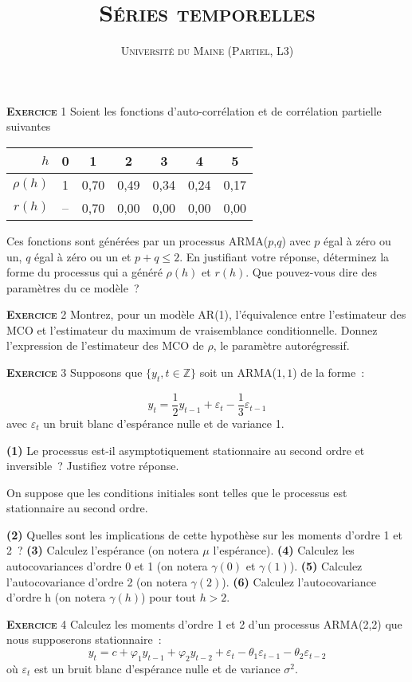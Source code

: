 \documentclass[10pt,a4paper,notitlepage,onecolumn]{article}
\newcommand{\exercice}[1]{\textsc{\textbf{Exercice}} #1}
\newcommand{\question}[1]{\textbf{(#1)}}
\begin{document}
\title{\textsc{Séries temporelles}}
\author{\textsc{Université du Maine (Partiel, L3)}}
\date{}


\maketitle

\exercice{1} Soient les fonctions d'auto-corrélation et de corrélation
partielle suivantes
\begin{table}[H]
  \centering
  \begin{tabular}{r|cccccc}
    \hline\hline
    $h$ & 0 & 1 & 2 & 3 & 4 & 5 \\\hline
    $\rho (h)$ & 1 & 0,70 & 0,49 & 0,34 & 0,24 & 0,17\\
    $r (h)$ & -- & 0,70 & 0,00 & 0,00 & 0,00 & 0,00\\
    \hline\hline
  \end{tabular}
\end{table}
\noindent Ces  fonctions sont générées par  un processus ARMA($p$,$q$)
avec $p$ égal à zéro ou un, $q$ égal  à zéro ou un et $p+q \leq 2$. En
justifiant  votre réponse,  déterminez  la forme  du  processus qui  a
généré $\rho(h)$ et $r(h)$. Que  pouvez-vous dire des paramètres du ce
modèle~?

\bigskip
\bigskip


\exercice{2}  Montrez,  pour  un  modèle  AR(1),  l'équivalence  entre
l'estimateur  des  MCO et  l'estimateur  du  maximum de  vraisemblance
conditionnelle. Donnez l'expression de l'estimateur des MCO de $\rho$,
le paramètre autorégressif.

\bigskip
\bigskip

\exercice{3} Supposons que $\{y_t,t\in\mathbb Z\}$ soit un ARMA($1,1$) de la forme :

\[
y_t = \frac{1}{2}y_{t-1} + \varepsilon_t - \frac{1}{3} \varepsilon_{t-1}
\]
avec $\varepsilon_t$ un bruit blanc d'espérance nulle et de variance 1.\newline

\question{1}   Le    processus   est-il   asymptotiquement
stationnaire  au   second  ordre   et  inversible~?   Justifiez  votre
réponse.\newline

On suppose  que les conditions initiales sont  telles que le
processus est stationnaire au second ordre.\newline

\question{2} Quelles sont les implications de cette hypothèse sur les moments d'ordre 1 et 2 ? \question{3} Calculez l'espérance (on notera $\mu$ l'espérance). \question{4} Calculez les autocovariances d'ordre 0 et 1 (on notera $\gamma(0)$ et $\gamma(1)$). \question{5} Calculez l'autocovariance d'ordre 2 (on notera $\gamma(2)$). \question{6} Calculez l'autocovariance d'ordre h (on notera $\gamma(h)$) pour tout $h>2$.

\bigskip
\bigskip

\exercice{4} Calculez les moments d'ordre 1 et 2 d'un processus ARMA(2,2) que nous supposerons stationnaire :
\[
y_t = c + \varphi_1 y_{t-1} + \varphi_2 y_{t-2} + \varepsilon_t - \theta_1 \varepsilon_{t-1} - \theta_2 \varepsilon_{t-2}
\]
où $\varepsilon_t$ est un bruit blanc d'espérance nulle et de variance $\sigma^2$. 
\end{document}
